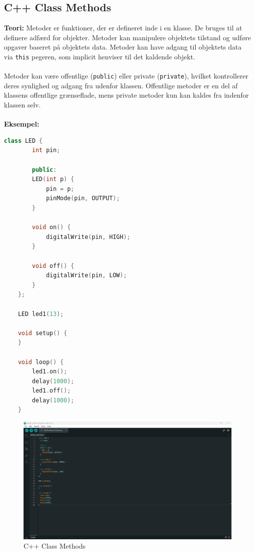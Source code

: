 \subsection{C++ Class Methods}
\textbf{Teori:} Metoder er funktioner, der er defineret inde i en klasse. De bruges til at definere adfærd for objekter. Metoder kan manipulere objektets tilstand og udføre opgaver baseret på objektets data. Metoder kan have adgang til objektets data via \texttt{this} pegeren, som implicit henviser til det kaldende objekt.
\\\\
\noindent Metoder kan være offentlige (\texttt{public}) eller private (\texttt{private}), hvilket kontrollerer deres synlighed og adgang fra udenfor klassen. Offentlige metoder er en del af klassens offentlige grænseflade, mens private metoder kun kan kaldes fra indenfor klassen selv.
\\\\
\noindent\textbf{Eksempel:}
\begin{lstlisting}[language=C++]
	class LED {
		int pin;
		
		public:
		LED(int p) {
			pin = p;
			pinMode(pin, OUTPUT);
		}
		
		void on() {
			digitalWrite(pin, HIGH);
		}
		
		void off() {
			digitalWrite(pin, LOW);
		}
	};
	
	LED led1(13);
	
	void setup() {
	}
	
	void loop() {
		led1.on();
		delay(1000);
		led1.off();
		delay(1000);
	}
\end{lstlisting}
\begin{figure}[h!]
	\centering
	\includegraphics[width=\textwidth]{fig/fig18.png}
	\caption{C++ Class Methods}
	\label{fig:18}
\end{figure}


